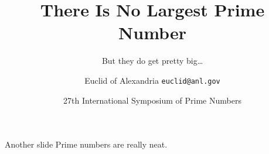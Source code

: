 \documentclass[aspectratio=149]{beamer}
\title{There Is No Largest Prime Number}
\subtitle{But they do get pretty big\ldots}
\date[ISPN ’80]{27th International Symposium of Prime Numbers}
\author[Euclid]{Euclid of Alexandria \texttt{euclid@anl.gov}}
\begin{document}
\begin{frame}
\titlepage
\end{frame}

\begin{frame}{Another slide}
  Prime numbers are really neat.
\end{frame}
\end{document}
